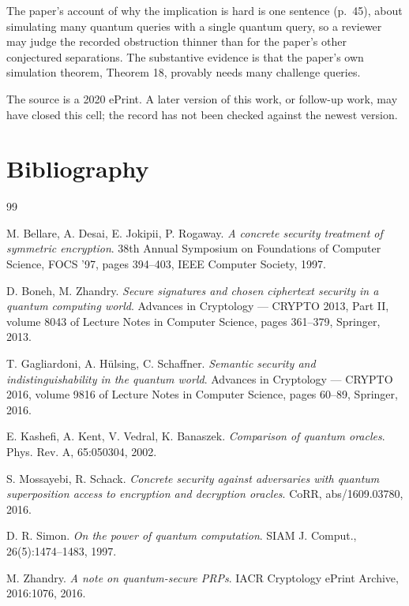 \documentclass{aicr-conjecture}
\begin{document}
\begin{remark}\label{rem:obstruction}
The paper's account of why the implication is hard is one sentence
(p.~45), about simulating many quantum queries with a single quantum
query, so a reviewer may judge the recorded obstruction thinner than for
the paper's other conjectured separations. The substantive evidence is
that the paper's own simulation theorem, Theorem 18, provably needs many
challenge queries.
\end{remark}

\begin{remark}\label{rem:currency}
The source is a 2020 ePrint. A later version of this work, or follow-up
work, may have closed this cell; the record has not been checked against
the newest version.
\end{remark}

\section{Bibliography}

\begin{aicrbibliography}{99}

M. Bellare, A. Desai, E. Jokipii, P. Rogaway.
\emph{A concrete security treatment of symmetric encryption}.
38th Annual Symposium on Foundations of Computer Science, FOCS '97,
pages 394--403, IEEE Computer Society, 1997.

D. Boneh, M. Zhandry.
\emph{Secure signatures and chosen ciphertext security in a quantum
computing world}.
Advances in Cryptology --- CRYPTO 2013, Part II, volume 8043 of Lecture
Notes in Computer Science, pages 361--379, Springer, 2013.

T. Gagliardoni, A. H\"ulsing, C. Schaffner.
\emph{Semantic security and indistinguishability in the quantum world}.
Advances in Cryptology --- CRYPTO 2016, volume 9816 of Lecture Notes in
Computer Science, pages 60--89, Springer, 2016.

E. Kashefi, A. Kent, V. Vedral, K. Banaszek.
\emph{Comparison of quantum oracles}.
Phys. Rev. A, 65:050304, 2002.

S. Mossayebi, R. Schack.
\emph{Concrete security against adversaries with quantum superposition
access to encryption and decryption oracles}.
CoRR, abs/1609.03780, 2016.

D. R. Simon.
\emph{On the power of quantum computation}.
SIAM J. Comput., 26(5):1474--1483, 1997.

M. Zhandry.
\emph{A note on quantum-secure PRPs}.
IACR Cryptology ePrint Archive, 2016:1076, 2016.

\end{aicrbibliography}
\end{document}
